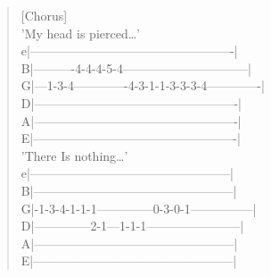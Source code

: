 \documentclass[11pt]{article}
\begin{document}
\begin{verse}
\vspace*{1em}
\vspace*{1em}
\vspace*{1em}
[Chorus]\\
\vspace*{1em}
'My head is pierced\ldots{}'\\
e|-------------------------------------------------|\\
B|----------4-4-4-5-4------------------------------|\\
G|---1-3-4-------------4-3-1-1-3-3-3-4-------------|\\
D|-------------------------------------------------|\\
A|-------------------------------------------------|\\
E|-------------------------------------------------|\\
\vspace*{1em}
'There Is nothing\ldots{}'\\
e|------------------------------------------------|\\
B|------------------------------------------------|\\
G|-1-3-4-1-1-1--------------0-3-0-1---------------|\\
D|--------------2-1---1-1-1-----------------------|\\
A|------------------------------------------------|\\
E|------------------------------------------------|\\
\end{verse}
\clearpage
\end{document}
